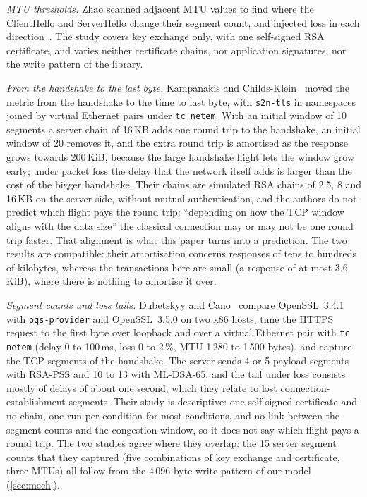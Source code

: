 \documentclass[preprint,12pt]{elsarticle}
\newcommand{\ms}{\,ms\xspace}
\begin{document}
\emph{MTU thresholds.} Zhao scanned adjacent MTU values to find where the ClientHello and ServerHello change their segment count, and injected loss in each direction~\cite{zhao2026}. The study covers key exchange only, with one self-signed RSA certificate, and varies neither certificate chains, nor application signatures, nor the write pattern of the library.

\emph{From the handshake to the last byte.} Kampanakis and Childs-Klein~\cite{kampanakis2024} moved the metric from the handshake to the time to last byte, with \texttt{s2n-tls} in namespaces joined by virtual Ethernet pairs under \texttt{tc netem}. With an initial window of 10 segments a server chain of 16\,KB adds one round trip to the handshake, an initial window of 20 removes it, and the extra round trip is amortised as the response grows towards 200\,KiB, because the large handshake flight lets the window grow early; under packet loss the delay that the network itself adds is larger than the cost of the bigger handshake. Their chains are simulated RSA chains of 2.5, 8 and 16\,KB on the server side, without mutual authentication, and the authors do not predict which flight pays the round trip: ``depending on how the TCP window aligns with the data size'' the classical connection may or may not be one round trip faster. That alignment is what this paper turns into a prediction. The two results are compatible: their amortisation concerns responses of tens to hundreds of kilobytes, whereas the transactions here are small (a response of at most 3.6\,KiB), where there is nothing to amortise it over.

\emph{Segment counts and loss tails.} Dubetskyy and Cano~\cite{dubetskyy2026} compare OpenSSL~3.4.1 with \texttt{oqs-provider} and OpenSSL~3.5.0 on two x86 hosts, time the HTTPS request to the first byte over loopback and over a virtual Ethernet pair with \texttt{tc netem} (delay 0 to 100\ms, loss 0 to 2\,\%, MTU 1\,280 to 1\,500 bytes), and capture the TCP segments of the handshake. The server sends 4 or 5 payload segments with RSA-PSS and 10 to 13 with ML-DSA-65, and the tail under loss consists mostly of delays of about one second, which they relate to lost connection-establishment segments. Their study is descriptive: one self-signed certificate and no chain, one run per condition for most conditions, and no link between the segment counts and the congestion window, so it does not say which flight pays a round trip. The two studies agree where they overlap: the 15 server segment counts that they captured (five combinations of key exchange and certificate, three MTUs) all follow from the 4\,096-byte write pattern of our model (\cref{sec:mech}).
\end{document}
